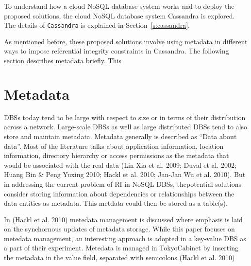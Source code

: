 To understand how a cloud \ac{NoSQL} database system works and to deploy
the proposed solutions, the cloud \ac{NoSQL} database system Cassandra
is explored. The details of \texttt{Cassandra} is explained in
Section~\ref{s:cassandra}.

%


As mentioned before, these proposed solutions involve using metadata in
different ways to impose referential integrity constraints in Cassandra. The
following section describes metadata briefly. This


\section{Metadata}\label{s:metadata}
DBSs today tend to be large with respect to size or in terms of their
distribution across a network. Large-scale DBSs as well as large distributed
DBSs tend to also store and maintain metadata. Metadata generally is described
as ``Data about data''. Most of the literature talks about application
information, location information, directory hierarchy or access permissions as
the metadata that would be associated with the real data (Lin Xia et al. 2009;
Duval et al. 2002; Huang Bin \& Peng Yuxing 2010; Hackl et al. 2010; Jan-Jan Wu
et al. 2010). But in addressing the current problem of RI in NoSQL DBSs,
thepotential solutions consider storing information about dependencies or
relationships between the data entities as metadata. This metdata could then be
stored as a table(s).

In (Hackl et al. 2010) metedata management is discussed where emphasis is laid
on the synchornous updates of metadata storage. While this paper focuses on
metedata management, an interesting approach is adopted in a key-value DBS as a
part of their experiment. Metedata is managed in TokyoCabinet by inserting the
metadata in the value field, separated with semicolons (Hackl et al. 2010)

